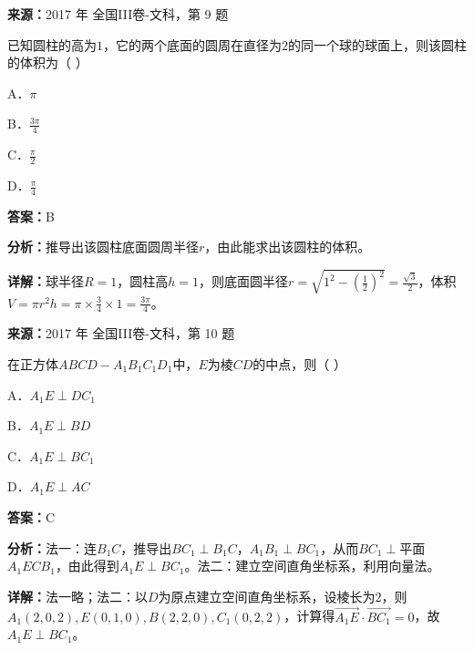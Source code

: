 \begin{question}[points=5]
\textbf{来源：}2017 年 全国III卷-文科，第 9 题\par
已知圆柱的高为$1$，它的两个底面的圆周在直径为$2$的同一个球的球面上，则该圆柱的体积为（            ）
\begin{choices}
  \item A．$\pi$
  \item B．$\frac{3\pi}{4}$
  \item C．$\frac{\pi}{2}$
  \item D．$\frac{\pi}{4}$
\end{choices}
\begin{solution}
\textbf{答案：}B

\textbf{分析：}推导出该圆柱底面圆周半径$r$，由此能求出该圆柱的体积。

\textbf{详解：}球半径$R=1$，圆柱高$h=1$，则底面圆半径$r=\sqrt{1^2-(\frac{1}{2})^2}=\frac{\sqrt{3}}{2}$，体积$V=\pi r^2 h=\pi\times\frac{3}{4}\times1=\frac{3\pi}{4}$。
\end{solution}
\end{question}

\begin{question}[points=5]
\textbf{来源：}2017 年 全国III卷-文科，第 10 题\par
在正方体$ABCD-A_1B_1C_1D_1$中，$E$为棱$CD$的中点，则（      ）
\begin{choices}
  \item A．$A_1E\perp DC_1$
  \item B．$A_1E\perp BD$
  \item C．$A_1E\perp BC_1$
  \item D．$A_1E\perp AC$
\end{choices}
\begin{solution}
\textbf{答案：}C

\textbf{分析：}法一：连$B_1C$，推导出$BC_1\perp B_1C$，$A_1B_1\perp BC_1$，从而$BC_1\perp$平面$A_1ECB_1$，由此得到$A_1E\perp BC_1$。法二：建立空间直角坐标系，利用向量法。

\textbf{详解：}法一略；法二：以$D$为原点建立空间直角坐标系，设棱长为$2$，则$A_1(2,0,2),E(0,1,0),B(2,2,0),C_1(0,2,2)$，计算得$\overrightarrow{A_1E}\cdot\overrightarrow{BC_1}=0$，故$A_1E\perp BC_1$。
\end{solution}
\end{question}

